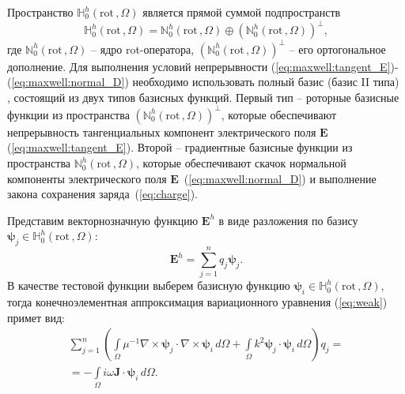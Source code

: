 \documentclass[a4paper,12pt]{article}
\begin{document}
Пространство $\mathbb{H}_{0}^h( \mathrm{rot}\,, \Omega )$ является прямой суммой подпространств~\citep{hiptmair,epov}
\begin{equation}
	\mathbb{H}_{0}^h( \mathrm{rot}\,, \Omega ) = \mathbb{N}_{0}^h( \mathrm{rot}\,, \Omega ) \oplus (\mathbb{N}_{0}^h( \mathrm{rot}\,, \Omega ))^{\bot} ,
	\label{eq:subspaces_sum}
\end{equation}
где $\mathbb{N}_{0}^h( \mathrm{rot}\,, \Omega )$ -- ядро rot-оператора, $(\mathbb{N}_{0}^h( \mathrm{rot}\,, \Omega ))^{\bot}$ -- его ортогональное дополнение. Для выполнения условий непрерывности (\ref{eq:maxwell:tangent_E})-(\ref{eq:maxwell:normal_D}) необходимо использовать полный базис (базис II типа) \citep{webb1993,webb1999,nedelec1980,nedelec1986,epov}, состоящий из двух типов базисных функций. Первый тип -- роторные базисные функции из пространства $(\mathbb{N}_{0}^h( \mathrm{rot}\,, \Omega ))^{\bot}$, которые обеспечивают непрерывность тангенциальных компонент электрического поля $\mathbf{E}$ (\ref{eq:maxwell:tangent_E}). Второй -- градиентные базисные функции из пространства $\mathbb{N}_{0}^h( \mathrm{rot}\,, \Omega )$, которые обеспечивают скачок нормальной компоненты электрического поля $\mathbf{E}$~(\ref{eq:maxwell:normal_D}) и выполнение закона сохранения заряда~(\ref{eq:charge}).

Представим векторнозначную функцию $\mathbf{E}^h$ в виде разложения по базису \linebreak $\boldsymbol{\psi}_j \in \mathbb{H}_{0}^h( \mathrm{rot}\,, \Omega )$:
\begin{equation*}
	\mathbf{E}^h = \sum\limits_{j = 1}^n q_j \boldsymbol{\psi}_j .
\end{equation*}
В качестве тестовой функции выберем базисную функцию $\boldsymbol{\psi}_i \in \mathbb{H}_{0}^h( \mathrm{rot}\,, \Omega )$, тогда конечноэлементная аппроксимация вариационного уравнения (\ref{eq:weak}) примет вид:
\begin{equation}
	\begin{array}{c} { \displaystyle
		\sum\limits_{j = 1}^n \left( \int\limits_\Omega \mu^{-1} \nabla \times \boldsymbol{\psi}_j \cdot \nabla \times \boldsymbol{\psi}_i \,d\Omega + \int\limits_\Omega k^{2} \boldsymbol{\psi}_j \cdot \boldsymbol{\psi}_i \,d\Omega \right) q_j =
	} \\ { \displaystyle
		=  - \int\limits_\Omega i \omega \mathbf{J} \cdot \boldsymbol{\psi}_i \,d\Omega .
	} \end{array}
	\label{eq:weak_discr}
\end{equation}
\end{document}
